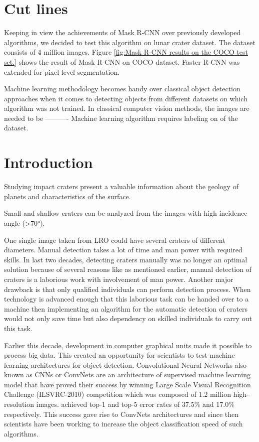 \documentclass[11pt]{article}
\begin{document}
\section{Cut lines}
Keeping in view the achievements of Mask R-CNN over previously developed algorithms, we decided to test this algorithm on lunar crater dataset. The dataset consists of 4 million images. Figure \ref{fig:Mask R-CNN results on the COCO test set.} shows the result of Mask R-CNN on COCO dataset. Faster R-CNN was extended for pixel level segmentation.

\par
Machine learning methodology becomes handy over classical object detection approaches when it comes to detecting objects from different datasets on which algorithm was not trained. In classical computer vision methods, the images are needed to be ---------- Machine learning algorithm requires labeling on of the dataset. 
 


\section{Introduction}
Studying impact craters present a valuable information about the geology of planets and characteristics of the surface.

\par
 Small and shallow craters can be analyzed from the images with high incidence angle (\textgreater70°).

\par
One single image taken from LRO could have several craters of different diameters. Manual detection takes a lot of time and man power with required skills. In last two decades, detecting craters manually was no longer an optimal solution because of several reasons like as mentioned earlier, manual detection of craters is a laborious work with involvement of man power. Another major drawback is that only qualified individuals can perform detection process. When technology is advanced enough that this laborious task can be handed over to a machine then implementing an algorithm for the automatic detection of craters would not only save time but also dependency on skilled individuals to carry out this task. 

\par
Earlier this decade, development in computer graphical units made it possible to process big data. This created an opportunity for scientists to test machine learning architectures for object detection. Convolutional Neural Networks also known as CNNs or ConvNets are an architecture of supervised machine learning model that have proved their success by winning Large Scale Visual Recognition Challenge (ILSVRC-2010) competition which was composed of 1.2 million high-resolution images. \cite{krizhevsky_imagenet_2012} achieved top-1 and top-5 error rates of 37.5\% and 17.0\% respectively. This success gave rise to ConvNets architectures and since then scientists have been working to increase the object classification speed of such algorithms.
\end{document}
